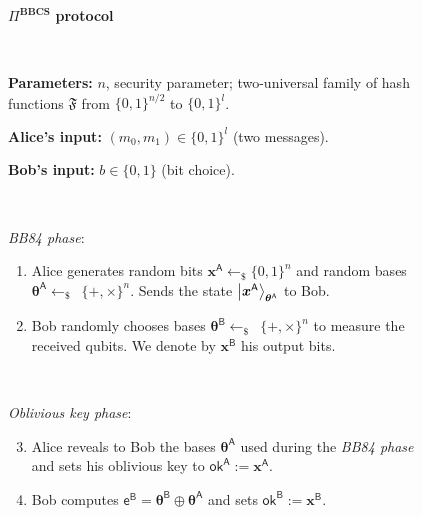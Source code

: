 \begin{figure}[h!]
    \centering
        \begin{tcolorbox}
            
            \centerline{$\Pi^{\textbf{BBCS}}$ \textbf{protocol}}
            
            \
            
            \textbf{Parameters:} $n$, security parameter; two-universal family of hash functions $\mathfrak{F}$ from $\{0,1\}^{n/2}$ to $\{0,1\}^{l}$.
            
            \textbf{Alice's input:} $(m_0, m_1)\in\{0,1\}^l$ (two messages). 
            
            \textbf{Bob's input:} $b\in\{0,1\}$ (bit choice).
            
            \
            
            \textit{BB84 phase}:
            \begin{enumerate}
                \item Alice generates random bits $\bm{x}^{\mathsf{A}}\leftarrow_{\$}\{0,1\}^n$ and random bases $\bm{\theta}^{\mathsf{A}}\leftarrow_{\$}$~$\{+,\times\}^n$. Sends the state $\ket{\bm{x}^{\mathsf{A}}}_{\bm{\theta}^{\mathsf{A}}}$ to Bob.
                \item Bob randomly chooses bases $\bm{\theta}^{\mathsf{B}}\leftarrow_{\$}$~$\{+,\times\}^n$ to measure the received qubits. We denote by $\bm{x}^{\mathsf{B}}$ his output bits.
            \end{enumerate}
            
            \
            
            \textit{Oblivious key phase}:
            \begin{enumerate}
            \setcounter{enumi}{2}
                \item Alice reveals to Bob the bases $\bm{\theta}^{\mathsf{A}}$ used during the \textit{BB84 phase} and sets his oblivious key to $\mathsf{ok}^{\mathsf{A}}:=\bm{x}^{\mathsf{A}}$.
                \item Bob computes $\mathsf{e}^\mathsf{B} = \bm{\theta}^{\mathsf{B}} \oplus \bm{\theta}^{\mathsf{A}}$ and sets $\mathsf{ok}^{\mathsf{B}}:=\bm{x}^{\mathsf{B}}$.
            \end{enumerate}
            
            \
            

\end{tcolorbox}
\end{figure}
